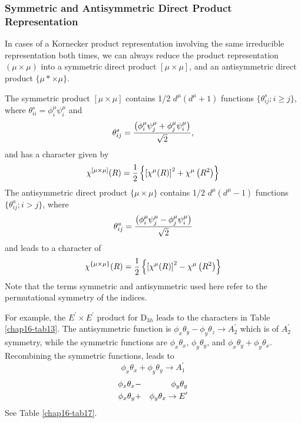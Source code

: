 \subsubsection{Symmetric and Antisymmetric Direct Product 
Representation}

In cases of a Kornecker product representation involving the same 
irreducible representation both times, we can always reduce the product
representation $( \mu \times \mu )$ into a symmetric direct 
product $[ \mu \times \mu ]$, and an antisymmetric direct product 
$\{ \mu * \times \mu \}$.  

The symmetric product $[ \mu \times \mu ]$ contains 1/2 
$d^{\mu}(d^{\mu} + 1)$ functions $\{ \theta^s_{ij} ; i \geq j \}$, 
where $\theta^s_{ii} = \phi^{\mu}_i \psi^{\mu}_i$ and
\begin{equation}
\theta^s_{ij} = {\left(\phi^{\mu}_i \psi^{\mu}_j + \phi^{\mu}_j 
\psi^{\mu}_i\right) \over \sqrt{2}},
\end{equation}
and has a character given by
\begin{equation}
\chi^{[\mu \times \mu]}(R) = {1 \over 2} \left\{ \left[ 
\chi^{\mu}(R) \right]^2 + \chi^{\mu} \left( R^2 \right) 
\right\}
\label{chap16-eqno69}
\end{equation}
The antisymmetric direct product $\{ \mu \times \mu \}$ contains 1/2 
$d^{\mu}(d^{\mu} - 1)$ functions $\{ \theta^a_{ij} ; i > j \}$, where
\begin{equation}
\theta^a_{ij} = {\left(\phi^{\mu}_i \psi^{\mu}_j - \phi^{\mu}_j 
\psi^{\mu}_i\right) \over \sqrt{2}}
\label{chap16-eqno70}
\end{equation}
and leads to a character of
\begin{equation}
\chi^{\{\mu \times \mu\}}(R) = {1 \over 2} \left\{ \left[ 
\chi^{\mu}(R) \right]^2 - \chi^{\mu} \left( R^2 \right) 
\right\}
\label{chap16-eqno71}
\end{equation}
Note that the terms symmetric and antisymmetric used here refer to 
the permutational symmetry of the indices.

For example, the $E^{\prime} \times E^{\prime}$ product for D$_{3h}$
leads to the characters in Table \ref{chap16-tab13}.  The
antisymmetric function is $\phi_x \theta_y - \phi_y \theta_z
\rightarrow A^{\prime}_2$ which is of $A^{\prime}_2$ symmetry, while
the symmetric functions are $\phi_x \theta_x$, $\phi_y \theta_y$, and
$\phi_x \theta_y + \phi_y \theta_x$.  Recombining the symmetric
functions, leads to
\begin{equation}
\phi_x \theta_x + \phi_y \theta_y \rightarrow A^{\prime}_1
\end{equation}
\begin{eqnarray}
\phi_x \theta_x &-& \phi_y \theta_y\cr
\phi_x \theta_y &+& \phi_y \theta_x \rightarrow E^{\prime}
\end{eqnarray}
See Table \ref{chap16-tab17}.

